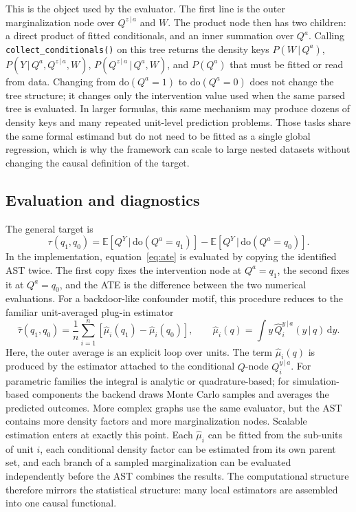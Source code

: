 \documentclass[unnumsec,webpdf,contemporary,large]{oup-authoring-template}%
\theoremstyle{thmstyleone}%
\theoremstyle{thmstyletwo}%
\theoremstyle{thmstylethree}%
\newcommand{\E}[1]{\mathbb{E}\left[#1\right]}
\newcommand{\rmdo}{\mathrm{do}}
\newcommand{\g}{\,\vert\,}
\newcommand{\di}{\mathrm{d}}
\begin{document}
This is the object used by the evaluator.
The first line is the outer marginalization node over $Q^{z\g a}$ and $W$.
The product node then has two children: a direct product of fitted conditionals, and an inner summation over $Q^a$.
Calling \texttt{collect\_conditionals()} on this tree returns the density keys $P(W\g Q^a)$, $P(Y\g Q^a,Q^{z\g a},W)$, $P(Q^{z\g a}\g Q^a,W)$, and $P(Q^a)$ that must be fitted or read from data.
Changing from $\rmdo(Q^a=1)$ to $\rmdo(Q^a=0)$ does not change the tree structure; it changes only the intervention value used when the same parsed tree is evaluated.
In larger formulas, this same mechanism may produce dozens of density keys and many repeated unit-level prediction problems.
Those tasks share the same formal estimand but do not need to be fitted as a single global regression, which is why the framework can scale to large nested datasets without changing the causal definition of the target.

\subsection{Evaluation and diagnostics}

The general target is
\begin{equation}
  \tau(q_1,q_0)
  =
  \E{Q^Y\g \rmdo(Q^a=q_1)}
  -
  \E{Q^Y\g \rmdo(Q^a=q_0)}.
  \label{eq:ate}
\end{equation}
In the implementation, equation~\eqref{eq:ate} is evaluated by copying the identified AST twice.
The first copy fixes the intervention node at $Q^a=q_1$, the second fixes it at $Q^a=q_0$, and the ATE is the difference between the two numerical evaluations.
For a backdoor-like confounder motif, this procedure reduces to the familiar unit-averaged plug-in estimator
\begin{equation}
  \widehat \tau(q_1,q_0)
  =
  \frac{1}{n}\sum_{i=1}^n
  \left[
  \widehat\mu_i(q_1)-\widehat\mu_i(q_0)
  \right],
  \qquad
  \widehat\mu_i(q)
  =
  \int y\, \widehat Q_i^{y\g a}(y\g q)\,\di y.
  \label{eq:plugin}
\end{equation}
Here, the outer average is an explicit loop over units.
The term $\widehat\mu_i(q)$ is produced by the estimator attached to the conditional $Q$-node $Q_i^{y\g a}$.
For parametric families the integral is analytic or quadrature-based; for simulation-based components the backend draws Monte Carlo samples and averages the predicted outcomes.
More complex graphs use the same evaluator, but the AST contains more density factors and more marginalization nodes.
Scalable estimation enters at exactly this point.
Each $\widehat\mu_i$ can be fitted from the sub-units of unit $i$, each conditional density factor can be estimated from its own parent set, and each branch of a sampled marginalization can be evaluated independently before the AST combines the results.
The computational structure therefore mirrors the statistical structure: many local estimators are assembled into one causal functional.
\end{document}
